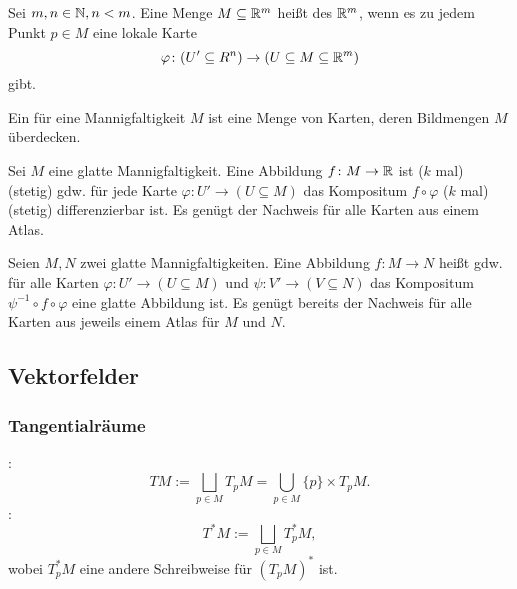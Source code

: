 \begin{definition}
Sei $m,n\in\mathbb N, n<m$. Eine Menge $M\subseteq\mathbb R^m$ heißt
 des $\mathbb R^m$, wenn
es zu jedem Punkt $p\in M$ eine lokale Karte
\begin{equation}
\varphi\colon (U'\subseteq R^n)\to (U\subseteq M\subseteq\mathbb R^m)
\end{equation}
gibt.
\end{definition}

\begin{definition}[Atlas]
Ein  für eine Mannigfaltigkeit $M$
ist eine Menge von Karten, deren Bildmengen $M$ überdecken.
\end{definition}

\begin{definition}
Sei $M$ eine glatte Mannigfaltigkeit.
Eine Abbildung $f\colon M\to\mathbb R$ ist ($k$ mal) (stetig)
gdw. für jede Karte $\varphi\colon U'\to (U\subseteq M)$ das
Kompositum $f\circ\varphi$ ($k$ mal) (stetig) differenzierbar ist.
Es genügt der Nachweis für alle Karten aus einem Atlas.
\end{definition}

\begin{definition}
Seien $M,N$ zwei glatte Mannigfaltigkeiten.
Eine Abbildung $f\colon M\to N$ heißt 
gdw. für alle Karten $\varphi\colon U'\to (U\subseteq M)$ und
$\psi\colon V'\to (V\subseteq N)$ das Kompositum
$\psi^{-1}\circ f\circ\varphi$ eine glatte Abbildung ist.
Es genügt bereits der Nachweis für alle Karten aus jeweils einem
Atlas für $M$ und $N$.
\end{definition}

\subsection{Vektorfelder}
\subsubsection{Tangentialräume}

:
\begin{equation}
TM := \bigsqcup_{p\in M} T_p M = \bigcup_{p\in M} \{p\}\times T_p M.
\end{equation}
:
\begin{equation}
T^*M := \bigsqcup_{p\in M} T_p^* M,
\end{equation}
wobei $T_p^* M$ eine andere Schreibweise für
$(T_p M)^*$ ist.

